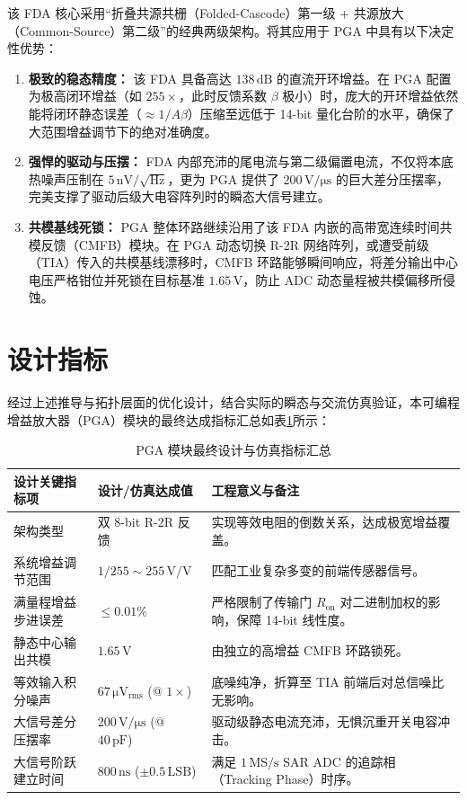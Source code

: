 该 FDA 核心采用“折叠共源共栅（Folded-Cascode）第一级 + 共源放大（Common-Source）第二级”的经典两级架构。将其应用于 PGA 中具有以下决定性优势：
\begin{enumerate}
    \item \textbf{极致的稳态精度：} 该 FDA 具备高达 $138\,\mathrm{dB}$ 的直流开环增益。在 PGA 配置为极高闭环增益（如 $255\times$，此时反馈系数 $\beta$ 极小）时，庞大的开环增益依然能将闭环静态误差（$\approx 1/A\beta$）压缩至远低于 14-bit 量化台阶的水平，确保了大范围增益调节下的绝对准确度。
    \item \textbf{强悍的驱动与压摆：} FDA 内部充沛的尾电流与第二级偏置电流，不仅将本底热噪声压制在 $5\,\mathrm{nV/\sqrt{Hz}}$，更为 PGA 提供了 $200\,\mathrm{V/\mu s}$ 的巨大差分压摆率，完美支撑了驱动后级大电容阵列时的瞬态大信号建立。
    \item \textbf{共模基线死锁：} PGA 整体环路继续沿用了该 FDA 内嵌的高带宽连续时间共模反馈（CMFB）模块。在 PGA 动态切换 R-2R 网络阵列，或遭受前级（TIA）传入的共模基线漂移时，CMFB 环路能够瞬间响应，将差分输出中心电压严格钳位并死锁在目标基准 $1.65\,\mathrm{V}$，防止 ADC 动态量程被共模偏移所侵蚀。
\end{enumerate}
\section{设计指标}

经过上述推导与拓扑层面的优化设计，结合实际的瞬态与交流仿真验证，本可编程增益放大器（PGA）模块的最终达成指标汇总如表\ref{tab:pga_final_specs}所示：

\begin{table}[H]
\centering
\caption{PGA 模块最终设计与仿真指标汇总}
\label{tab:pga_final_specs}
\begin{tabular}{lp{3.5cm}p{7cm}}
\toprule
\textbf{设计关键指标项} & \textbf{设计/仿真达成值} & \textbf{工程意义与备注} \\
\midrule
架构类型 & 双 8-bit R-2R 反馈 & 实现等效电阻的倒数关系，达成极宽增益覆盖。 \\
系统增益调节范围 & $1/255 \sim 255\,\mathrm{V/V}$ & 匹配工业复杂多变的前端传感器信号。 \\
满量程增益步进误差 & $\le 0.01\%$ & 严格限制了传输门 $R_{\mathrm{on}}$ 对二进制加权的影响，保障 14-bit 线性度。 \\
静态中心输出共模 & $1.65\,\mathrm{V}$ & 由独立的高增益 CMFB 环路锁死。 \\
等效输入积分噪声 & $67\,\mathrm{\mu V_{rms}}$ (@ $1\times$) & 底噪纯净，折算至 TIA 前端后对总信噪比无影响。 \\
大信号差分压摆率 & $200\,\mathrm{V/\mu s}$ (@ $40\,\mathrm{pF}$) & 驱动级静态电流充沛，无惧沉重开关电容冲击。 \\
大信号阶跃建立时间 & $800\,\mathrm{ns}$ ($\pm 0.5\,\mathrm{LSB}$) & 满足 $1\,\mathrm{MS/s}$ SAR ADC 的追踪相（Tracking Phase）时序。 \\
\bottomrule
\end{tabular}
\end{table}